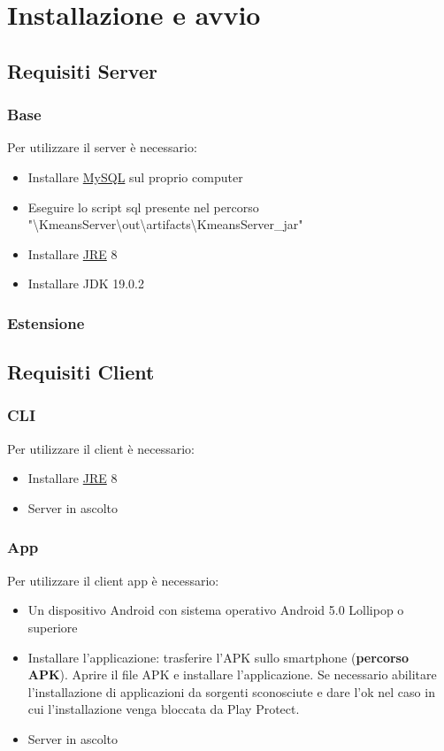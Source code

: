 \section{Installazione e avvio}
\subsection{Requisiti Server}
\subsubsection{Base}
\noindent Per utilizzare il server è necessario:
\begin{itemize}[label=-]
  \item Installare \href{https://dev.mysql.com/downloads/installer/}{MySQL} sul proprio computer
  \item Eseguire lo script sql presente nel percorso "\textbackslash KmeansServer\textbackslash out\textbackslash artifacts\textbackslash KmeansServer\_jar"
  \item Installare \href{https://www.oracle.com/technetwork/java/javase/downloads/jre8-downloads-2133155.html}{JRE} 8
  \item Installare JDK 19.0.2
\end{itemize}

\subsubsection{Estensione}


\subsection{Requisiti Client}
\subsubsection{CLI}
\noindent Per utilizzare il client è necessario:
\begin{itemize}[label=-]
  \item Installare \href{https://www.oracle.com/technetwork/java/javase/downloads/jre8-downloads-2133155.html}{JRE} 8  
  \item Server in ascolto
\end{itemize}

\subsubsection{App}
\noindent Per utilizzare il client app è necessario:
\begin{itemize}[label=-]
  \item Un dispositivo Android con sistema operativo Android 5.0 Lollipop o superiore
  \item Installare l'applicazione: trasferire l'APK sullo smartphone (\textbf{percorso APK}). Aprire il file APK e installare l'applicazione. Se necessario abilitare l'installazione di applicazioni da sorgenti sconosciute e dare l'ok nel caso in cui l'installazione venga bloccata da Play Protect.
  \item Server in ascolto
\end{itemize}


